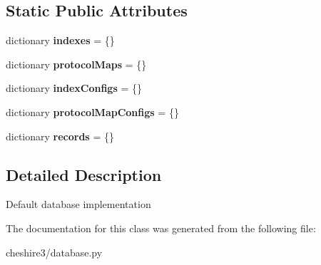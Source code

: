 \subsection*{Static Public Attributes}
\begin{DoxyCompactItemize}
\item 
\hypertarget{classcheshire3_1_1database_1_1_simple_database_a12d5f6239d52b9fe42a14faf75e7beff}{dictionary {\bfseries indexes} = \{\}}\label{classcheshire3_1_1database_1_1_simple_database_a12d5f6239d52b9fe42a14faf75e7beff}

\item 
\hypertarget{classcheshire3_1_1database_1_1_simple_database_af24ae4d7af8e754f545c0987f245f3c1}{dictionary {\bfseries protocol\-Maps} = \{\}}\label{classcheshire3_1_1database_1_1_simple_database_af24ae4d7af8e754f545c0987f245f3c1}

\item 
\hypertarget{classcheshire3_1_1database_1_1_simple_database_a20f5a86be74fe01fffb93466f742fee6}{dictionary {\bfseries index\-Configs} = \{\}}\label{classcheshire3_1_1database_1_1_simple_database_a20f5a86be74fe01fffb93466f742fee6}

\item 
\hypertarget{classcheshire3_1_1database_1_1_simple_database_a52216dad0b5f8dc934aff78f0f41d258}{dictionary {\bfseries protocol\-Map\-Configs} = \{\}}\label{classcheshire3_1_1database_1_1_simple_database_a52216dad0b5f8dc934aff78f0f41d258}

\item 
\hypertarget{classcheshire3_1_1database_1_1_simple_database_a460f40653dacee85d4de9ea98f2018cd}{dictionary {\bfseries records} = \{\}}\label{classcheshire3_1_1database_1_1_simple_database_a460f40653dacee85d4de9ea98f2018cd}

\end{DoxyCompactItemize}


\subsection{Detailed Description}
\begin{DoxyVerb}Default database implementation\end{DoxyVerb}
 

The documentation for this class was generated from the following file\-:\begin{DoxyCompactItemize}
\item 
cheshire3/database.\-py\end{DoxyCompactItemize}
